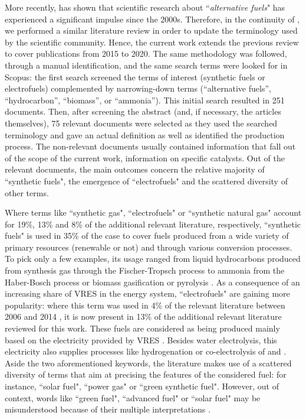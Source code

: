 More recently, \citet{Stancin2020} has shown that scientific research about ``\textit{alternative fuels}" has experienced a significant impulse since the 2000s. Therefore, in the continuity of \cite{ridjan2016}, we performed a similar literature review in order to update the terminology used by the scientific community. Hence, the current work extends the previous review to cover publications from 2015 to 2020. The same methodology was followed, through a manual identification, and the same search terms were looked for in Scopus: the first search screened the terms of interest (\ie synthetic fuels or electrofuels) complemented by narrowing-down terms (\eg “alternative fuels”, “hydrocarbon”, “biomass”, or “ammonia”). This initial search resulted in 251 documents. Then, after screening the abstract (and, if necessary, the articles themselves), 75 relevant documents were selected as they used the searched terminology and gave an actual definition as well as identified the production process. The non-relevant documents usually contained information that fall out of the scope of the current work, \eg information on specific catalysts. Out of the relevant documents, the main outcomes concern the relative majority of ``synthetic fuels", the emergence of ``electrofuels" and the scattered diversity of other terms. 

Where terms like ``synthetic gas", ``electrofuels" or ``synthetic natural gas" account for 19\%, 13\% and 8\% of the additional relevant literature, respectively, ``synthetic fuels" is used in 35\% of the case to cover fuels produced from a wide variety of primary resources (renewable or not) and through various conversion processes. To pick only a few examples, its usage ranged from liquid hydrocarbons produced from synthesis gas through the Fischer-Tropsch process \cite{haarlemmer2014,Trieb2018} to ammonia from the Haber-Bosch process \cite{bargiacchi2019} or biomass gasification or pyrolysis \cite{monaco2018, rao2015}. As a consequence of an increasing share of VRES in the energy system, ``electrofuels" are gaining more popularity: where this term was used in 4\% of the relevant literature between 2006 and 2014 \cite{ridjan2016}, it is now present in 13\% of the additional relevant literature reviewed for this work. These fuels are considered as being produced mainly based on the electricity provided by VRES \cite{brynolf2018}. Besides water electrolysis, this electricity also supplies processes like  hydrogenation \cite{brynolf2018,Decker2019,Pearson2012} or co-electrolysis of  and  \cite{hanggi2019,larsson2015}. Aside the two aforementioned keywords, the literature makes use of a scattered diversity of terms that aim at precising the features of the considered fuel: for instance, ``solar fuel", ``power gas" or ``green synthetic fuel". However, out of context, words like ``green fuel", ``advanced fuel" or ``solar fuel" may be misunderstood because of their multiple interpretations \cite{ridjan2016}.

